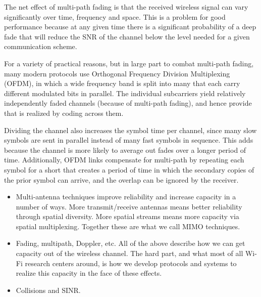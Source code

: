 The net effect of multi-path fading is that the received wireless signal can vary significantly over time, frequency and space. This is a problem for good performance because at any given time there is a significant probability of a deep fade that will reduce the SNR of the channel below the level needed for a given communication scheme.

For a variety of practical reasons, but in large part to combat multi-path fading, many modern protocols use Orthogonal Frequency Division Multiplexing (OFDM), in which a wide frequency band is split into many  that each carry different modulated bits in parallel.
The individual subcarriers yield relatively independently faded channels (because of multi-path fading), and hence provide  that is realized by coding across them.

Dividing the channel also increases the symbol time per channel, since many slow symbols are sent in parallel instead of many fast symbols in sequence. This adds  because the channel is more likely to average out fades over a longer period of time. Additionally, OFDM links compensate for multi-path by repeating each symbol for a short  that creates a period of time in which the secondary copies of the prior symbol can arrive, and the  overlap can be ignored by the receiver.


\begin{itemize}
\item Multi-antenna techniques improve reliability and increase capacity in a number of ways. More transmit/receive antennas means better reliability through spatial diversity. More spatial streams means more capacity via spatial multiplexing. Together these are what we call MIMO techniques.

\item Fading, multipath, Doppler, etc. All of the above describe how we can get capacity out of the wireless channel. The hard part, and what most of all Wi-Fi research centers around, is how we develop protocols and systems to realize this capacity in the face of these effects.

\item Collisions and SINR.

\end{itemize}


